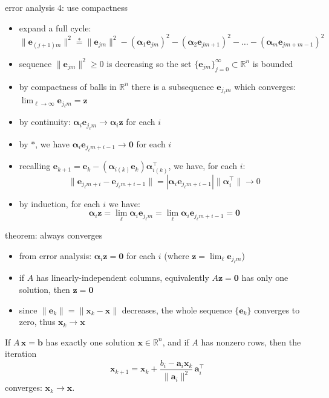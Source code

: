 \documentclass[usepdftitle=false,usenames,dvipsnames]{beamer}
\newcommand{\RR}{\mathbb{R}}
\newcommand{\ba}{\mathbf{a}}
\newcommand{\bb}{\mathbf{b}}
\newcommand{\be}{\mathbf{e}}
\newcommand{\bx}{\mathbf{x}}
\newcommand{\bz}{\mathbf{z}}
\newcommand{\balpha}{\bm{\alpha}}
\newcommand{\bzero}{\bm{0}}
\newcommand{\ds}{\displaystyle}
\begin{document}
\begin{frame}{error analysis 4: use compactness}

\begin{itemize}
\item expand a full cycle:
    $$\|\be_{(j+1)m}\|^2 \stackrel{\ast}{=} \|\be_{jm}\|^2 - (\balpha_1 \be_{jm})^2 - (\balpha_2 \be_{jm+1})^2 - \dots - (\balpha_m \be_{jm+m-1})^2$$
\item sequence $\|\be_{jm}\|^2 \ge 0$ is decreasing so the set $\{\be_{jm}\}_{j=0}^\infty \subset \RR^n$ is bounded
\item by \alert{compactness} of balls in $\RR^n$ there is a subsequence $\be_{j_\ell m}$ which converges: \quad $\ds \lim_{\ell\to\infty} \be_{j_\ell m} = \bz$

\item by continuity: $\balpha_i \be_{j_\ell m} \to \balpha_i \bz$ for each $i$
\item by $\ast$, we have $\balpha_i \be_{j_\ell m + i - 1} \to \bzero$ for each $i$
\item recalling $\be_{k+1} = \be_k - (\balpha_{i(k)} \be_k) \balpha_{i(k)}^\top$, we have, for each $i$:
    $$\|\be_{j_\ell m + i} - \be_{j_\ell m + i - 1}\| = |\balpha_i \be_{j_\ell m + i - 1}| \|\balpha_i^\top\| \to 0$$
\item by induction, for each $i$ we have:
    $$\balpha_i \bz = \lim_{\ell} \balpha_i \be_{j_\ell m} = \lim_{\ell} \balpha_i \be_{j_\ell m + i - 1} = \bzero$$
\end{itemize}
\end{frame}


\begin{frame}{theorem: always converges}

\begin{itemize}
\item from error analysis: $\balpha_i \bz = \bzero$ for each $i$ (where $\bz = \lim_\ell \be_{j_\ell m}$)
\item if $A$ has linearly-independent columns, equivalently $A\bz=\bzero$ has only one solution, then $\bz=\bzero$
\item since $\|\be_k\| = \|\bx_k - \bx\|$ decreases, the whole sequence $\{\be_k\}$ converges to zero, thus $\bx_k \to \bx$
\end{itemize}

\begin{theorem}[Kaczmarz, 1937]
If $A\, \bx = \bb$ has exactly one solution $\bx\in\RR^n$, and if $A$ has nonzero rows, then the iteration
    $$\bx_{k+1} = \bx_k + \frac{b_i - \ba_i \bx_k}{\|\ba_i\|^2}\, \ba_i^\top$$
converges: $\bx_k \to \bx$.
\end{theorem}
\end{frame}
\end{document}
